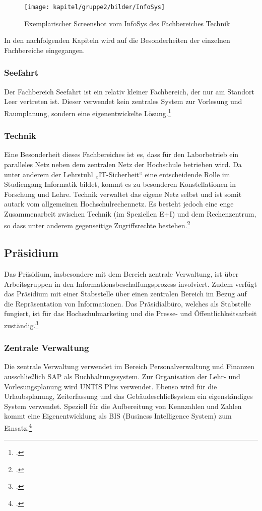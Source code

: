 \begin{figure}[h!]
	\centering
	\texttt{[image: kapitel/gruppe2/bilder/InfoSys]}
	\caption{Exemplarischer Screenshot vom InfoSys des Fachbereiches Technik\protect\footnotemark}
	\label{fig_InfoSys}
\end{figure}

In den nachfolgenden Kapiteln wird auf die Besonderheiten der einzelnen Fachbereiche eingegangen.

\subsubsection{Seefahrt}
Der Fachbereich Seefahrt ist ein relativ kleiner Fachbereich, der nur am Standort Leer vertreten ist. Dieser verwendet kein zentrales System zur Vorlesung und Raumplanung, sondern eine eigenentwickelte Lösung.\footcite{gunter_muller_interview}

\subsubsection{Technik}
Eine Besonderheit dieses Fachbereiches ist es, dass für den Laborbetrieb ein paralleles Netz neben dem zentralen Netz der Hochschule betrieben wird. Da unter anderem der Lehrstuhl „IT-Sicherheit“ eine entscheidende Rolle im Studiengang Informatik bildet, kommt es zu besonderen Konstellationen in Forschung und Lehre. Technik verwaltet das eigene Netz selbst und ist somit autark vom allgemeinen Hochschulrechennetz. Es besteht jedoch eine enge Zusammenarbeit zwischen Technik (im Speziellen E+I) und dem Rechenzentrum, so dass unter anderem gegenseitige Zugriffsrechte bestehen.\footcite[Vgl.][]{gunter_muller_interview} 

\subsection{Präsidium}
\label{praesidium_label}

Das Präsidium, insbesondere mit dem Bereich zentrale Verwaltung, ist über  Arbeitsgruppen in den Informationsbeschaffungsprozess involviert. Zudem verfügt das Präsidium mit einer Stabsstelle über einen zentralen Bereich im Bezug auf die Repräsentation von Informationen. Das Präsidialbüro, welches als Stabstelle fungiert, ist für das Hochschulmarketing und die Presse- und Öffentlichkeitsarbeit zuständig.\footcite{hsel_organigramm_2015}

\subsubsection{Zentrale Verwaltung}
Die zentrale Verwaltung verwendet im Bereich Personalverwaltung und Finanzen ausschließlich SAP als Buchhaltungssystem. Zur Organisation der Lehr- und Vorlesungsplanung wird UNTIS Plus verwendet. Ebenso wird für die Urlaubsplanung, Zeiterfassung und das Gebäudeschließsystem ein eigenständiges System verwendet. Speziell für die Aufbereitung von Kennzahlen und Zahlen kommt eine Eigenentwicklung als BIS (Business Intelligence System) zum Einsatz.\footcite[Vgl.][]{gunter_muller_interview}

